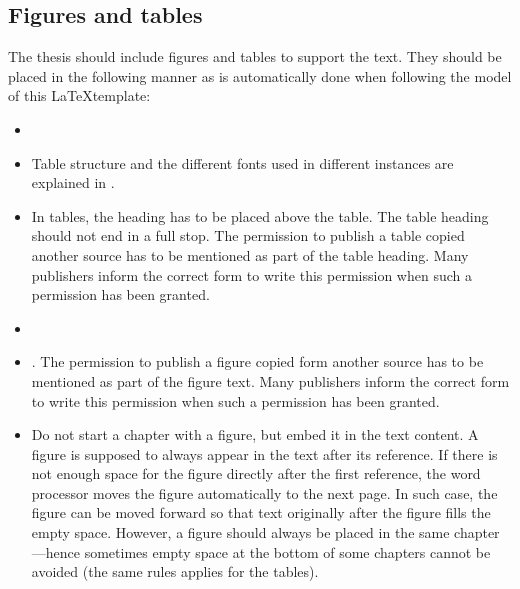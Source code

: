 \subsection{Figures and tables}
The thesis should include figures and tables to support the text.
They should be placed in the following manner as is automatically
done when following the model of this \LaTeX\DIFaddbegin \DIFadd{\ }\DIFaddend template:

\begin{itemize}
    \setlength\itemsep{0pt}
    \setlength\parskip{0pt}
  \item \DIFdelbegin {}%
\item%
\DIFdelend Table structure and the different fonts used in different
    instances are explained in .
  \item In tables, the heading has to be placed above the table. The
    table heading should not end in a full stop. The permission to
    publish a table copied \DIFdelbegin {}\DIFdelend \DIFaddbegin {}\DIFaddend another source has to be mentioned as
    part of the table heading. Many publishers inform the correct
    form to write this permission when such a permission has been
    granted. \DIFdelbegin %
\item%
\DIFdelend \DIFaddbegin {}\item {}\DIFaddend . The permission to publish a
    figure copied form another source has to be mentioned as part of
    the figure text. Many publishers inform the correct form to write
    this permission when such a permission has been granted.  \DIFaddbegin {}\DIFaddend \item Do not start a chapter with a figure, but embed it in the
    text content. A figure is supposed to always appear in the text
    after its reference. If there is not enough space for the figure
    directly after the first reference, the word processor moves the
    figure automatically to the next page. In such case, the figure
    can be moved forward so that text originally after the figure
    fills the empty space. However, a figure should always be placed
    in the same chapter---hence sometimes empty space at the bottom
    of some chapters cannot be avoided (the same rules applies for the tables).
\end{itemize}

